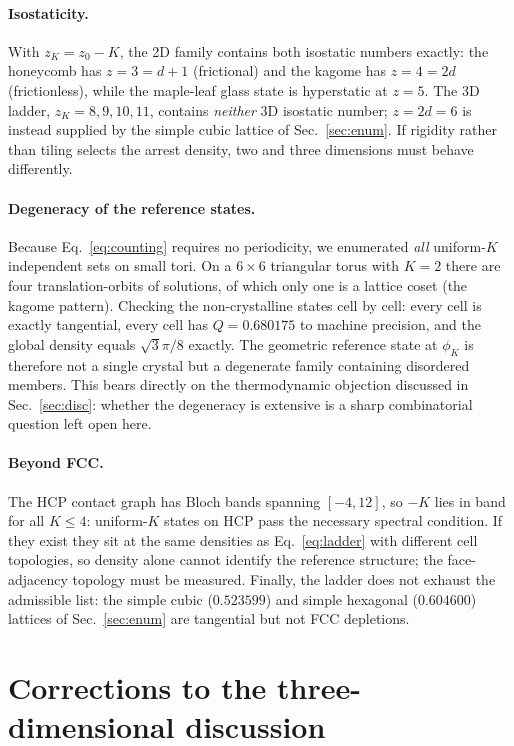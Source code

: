 \documentclass[aps,prl,twocolumn,superscriptaddress,floatfix]{revtex4-2}
\begin{document}
\paragraph{Isostaticity.} With $z_K = z_0-K$, the 2D family contains both
isostatic numbers exactly: the honeycomb has $z=3=d+1$ (frictional) and the
kagome has $z=4=2d$ (frictionless), while the maple-leaf glass state is
hyperstatic at $z=5$. The 3D ladder, $z_K=8,9,10,11$, contains \emph{neither}
3D isostatic number; $z=2d=6$ is instead supplied by the simple cubic lattice
of Sec.~\ref{sec:enum}. If rigidity rather than tiling selects the arrest
density, two and three dimensions must behave differently.

\paragraph{Degeneracy of the reference states.} Because
Eq.~\eqref{eq:counting} requires no periodicity, we enumerated \emph{all}
uniform-$K$ independent sets on small tori. On a $6\times6$ triangular torus
with $K=2$ there are four translation-orbits of solutions, of which only one is
a lattice coset (the kagome pattern). Checking the non-crystalline states cell
by cell: every cell is exactly tangential, every cell has
$Q=0.680175$ to machine precision, and the global density equals
$\sqrt3\pi/8$ exactly. The geometric reference state at $\phi_K$ is therefore
not a single crystal but a degenerate family containing disordered members.
This bears directly on the thermodynamic objection discussed in
Sec.~\ref{sec:disc}: whether the degeneracy is extensive is a sharp
combinatorial question left open here.

\paragraph{Beyond FCC.} The HCP contact graph has Bloch bands spanning
$[-4,12]$, so $-K$ lies in band for all $K\leq4$: uniform-$K$ states on HCP
pass the necessary spectral condition. If they exist they sit at the same
densities as Eq.~\eqref{eq:ladder} with different cell topologies, so density
alone cannot identify the reference structure; the face-adjacency topology must
be measured. Finally, the ladder does not exhaust the admissible list: the
simple cubic ($0.523599$) and simple hexagonal ($0.604600$) lattices of
Sec.~\ref{sec:enum} are tangential but not FCC depletions.

\section{Corrections to the three-dimensional discussion}
\label{sec:corrections}
\end{document}

